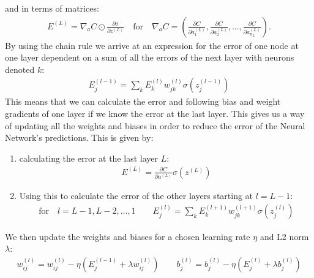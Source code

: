 \documentclass[11pt]{article}
\begin{document}
and in terms of matrices:
\begin{align*}
    E^{(L)} = \nabla_a C \odot \frac{\partial \sigma }{\partial z^{(L)}} \quad \text{for} \quad \nabla_a C = \left(\frac{\partial C }{\partial a_1^{(L)}}, \frac{\partial C }{\partial a_2^{(L)}},..., \frac{\partial C }{\partial a_{n_L}^{(L)}}\right).
\end{align*}
By using the chain rule we arrive at an expression for the error of one node at one layer dependent on a sum of all the errors of the next layer with neurons denoted $k$:
\begin{align*}
    E^{(l-1)}_j = \sum_k E^{(l)}_k w_{jk}^{(l)}\sigma(z_j^{(l-1)})
\end{align*}
This means that we can calculate the error and following bias and weight gradients of one layer if we know the error at the last layer. This gives us a way of updating all the weights and biases in order to reduce the error of the Neural Network's predictions. This is given by:
\begin{enumerate}
    \item calculating the error at the last layer $L$:
          \begin{align*}
              E^{(L)} = \frac{\partial C }{\partial a^{(L)}} \sigma(z^{(L)})
          \end{align*}
    \item Using this to calculate the error of the other layers starting at $l=L-1$:
          \begin{align*}
              \text{for}\quad  l=L-1, L-2,...,1 \quad\quad
              E_j^{(l)} = \sum_k E^{(l+1)}_k w_{jk}^{(l+1)} \sigma(z_j^{(l)})
          \end{align*}
\end{enumerate}
We then update the weights and biases for a chosen learning rate $\eta$ and L2 norm $\lambda$:
\begin{align*}
    w^{(l)}_{ij} = w^{(l)}_{ij} - \eta(E_j^{(l-1)}  + \lambda w_{ij}^{(l)}) \quad\quad b_j^{(l)} = b_j^{(l)} - \eta(E_j^{(l)} + \lambda b_j^{(l)})
\end{align*}
\end{document}
